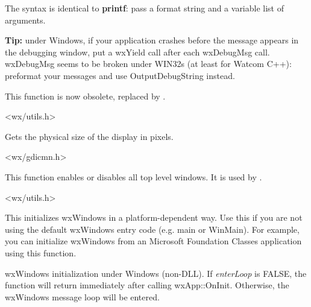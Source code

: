 The syntax is identical to {\bf printf}: pass a format string and a
variable list of arguments.

{\bf Tip:} under Windows, if your application crashes before the
message appears in the debugging window, put a wxYield call after
each wxDebugMsg call. wxDebugMsg seems to be broken under WIN32s
(at least for Watcom C++): preformat your messages and use OutputDebugString
instead.

This function is now obsolete, replaced by .


<wx/utils.h>



Gets the physical size of the display in pixels.


<wx/gdicmn.h>

\label{wxenabletoplevelwindows}


This function enables or disables all top level windows. It is used by
.


<wx/utils.h>

\label{wxentry}

This initializes wxWindows in a platform-dependent way. Use this if you
are not using the default wxWindows entry code (e.g. main or WinMain). For example,
you can initialize wxWindows from an Microsoft Foundation Classes application using
this function.


wxWindows initialization under Windows (non-DLL). If {\it enterLoop} is FALSE, the
function will return immediately after calling wxApp::OnInit. Otherwise, the wxWindows
message loop will be entered.


